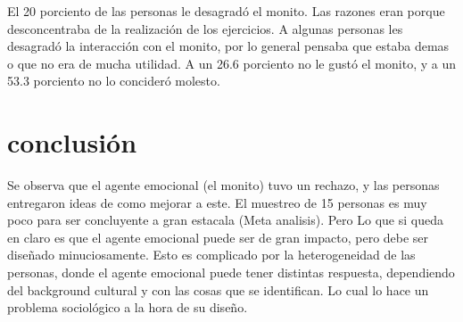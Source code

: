 \documentclass{article}
\begin{document}
    El 20  porciento de las personas le desagradó el monito. Las razones eran porque desconcentraba de la realización de los ejercicios. A algunas personas les desagradó la interacción con el monito, por lo general pensaba que estaba demas o que no era de mucha utilidad. A un 26.6 porciento no le gustó el monito, y a un 53.3 porciento no lo concideró molesto.
\newline 
\newline 

\section{conclusión}
    Se observa que el agente emocional (el monito) tuvo un rechazo, y las personas entregaron ideas de como mejorar a este. El muestreo de 15 personas es muy poco para ser concluyente a gran estacala (Meta analisis). Pero Lo que si queda en claro es que el agente emocional puede ser de gran impacto, pero debe ser diseñado minuciosamente. Esto es complicado por la heterogeneidad de las personas, donde el agente emocional puede tener distintas respuesta, dependiendo del background cultural y con las cosas que se identifican. Lo cual lo hace un problema sociológico a la hora de su diseño.  
\end{document}

